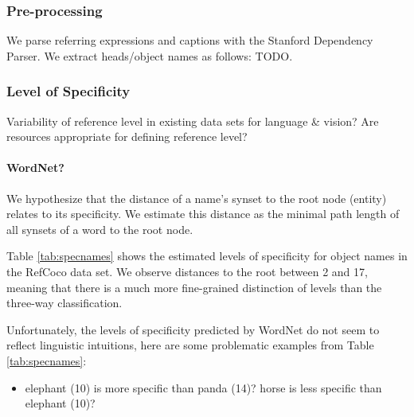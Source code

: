{\subsubsection{Pre-processing}
We parse referring expressions and captions with the Stanford Dependency Parser.
We extract heads/object names as follows: TODO.

\subsubsection{Level of Specificity} 
Variability of reference level in existing data sets for language \& vision?
Are resources appropriate for defining reference level?
\paragraph{WordNet?}

We hypothesize that the distance of a name's synset to the root node (entity) relates to its specificity.
We estimate this distance as the minimal path length of all synsets of a word  to the root node.

Table \ref{tab:specnames} shows the estimated levels of specificity for object names in the RefCoco data set.
We observe distances to the root between 2 and 17, meaning that there is a much more fine-grained distinction of levels than the three-way classification.

Unfortunately, the levels of specificity predicted by WordNet do not seem to reflect linguistic intuitions, here are some problematic examples from Table \ref{tab:specnames}:

\begin{itemize}
\item elephant (10) is more specific than panda (14)? horse is less specific than elephant (10)?
\end{itemize}


}

